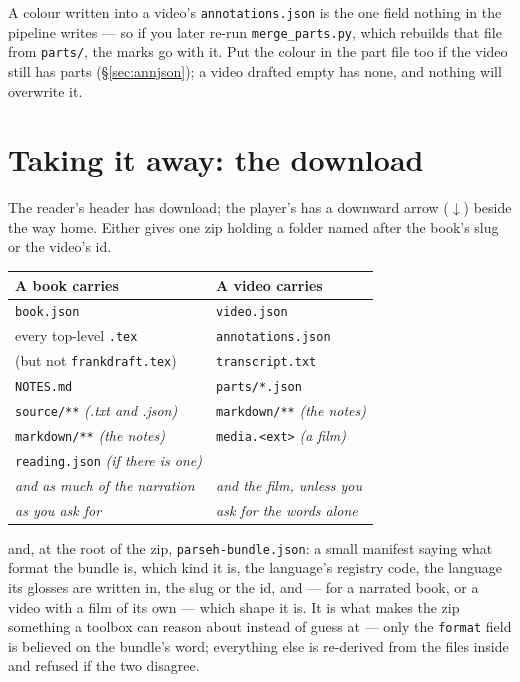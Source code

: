 \documentclass[11pt,oneside]{report}
\newcommand{\file}[1]{\texttt{#1}}
\newcommand{\menu}[1]{\textsf{#1}}
\begin{document}
\begin{warnbox}
A colour written into a video's \file{annotations.json} is the one field
nothing in the pipeline writes --- so if you later re-run
\file{merge\_parts.py}, which rebuilds that file from \file{parts/}, the
marks go with it. Put the colour in the part file too if the video still has
parts (\S\ref{sec:annjson}); a video drafted empty has none, and nothing will
overwrite it.
\end{warnbox}

\section{Taking it away: the download}
\label{sec:download}

The reader's header has \menu{download}; the player's has a downward arrow
(\(\downarrow\)) beside the way home. Either gives one zip holding a folder named after the
book's slug or the video's id.

\begin{center}
\begin{tabular}{@{}ll@{}}
\toprule
\textsf{A book carries} & \textsf{A video carries} \\
\midrule
\file{book.json} & \file{video.json} \\
every top-level \file{.tex} & \file{annotations.json} \\
\quad (but not \file{frankdraft.tex}) & \file{transcript.txt} \\
\file{NOTES.md} & \file{parts/*.json} \\
\file{source/**} \emph{(.txt and .json)} & \file{markdown/**} \emph{(the notes)} \\
\file{markdown/**} \emph{(the notes)} & \file{media.<ext>} \emph{(a film)} \\
\file{reading.json} \emph{(if there is one)} & \\
\addlinespace
\emph{and as much of the narration} & \emph{and the film, unless you} \\
\emph{as you ask for} & \emph{ask for the words alone} \\
\bottomrule
\end{tabular}
\end{center}

\noindent and, at the root of the zip, \file{parseh-bundle.json}: a small
manifest saying what format the bundle is, which kind it is, the language's
registry code, the language its glosses are written in, the slug or the id,
and --- for a narrated book, or a video with a film of its own --- which
shape it is. It is
what makes the zip something a toolbox can reason about instead of guess at
--- only the \texttt{format} field is believed on the bundle's word;
everything else is re-derived from the files inside and refused if the two
disagree.
\end{document}
